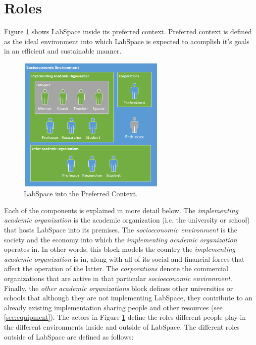 \documentclass[a4paper, 11pt]{article}
\begin{document}
\section{Roles}
Figure \ref{fig:ls_env} shows LabSpace inside its preferred context. Preferred context is defined as the ideal environment into which LabSpace is expected to acomplish it's goals in an efficient and sustainable manner.

\begin{figure}[h!]
  \begin{center}
    \includegraphics[width=270px,height=\textheight,keepaspectratio]{imagery/ls_context.png}
    \caption{LabSpace into the Preferred Context.}
    \label{fig:ls_env}
  \end{center}
\end{figure}

Each of the components is explained in more detail below. The \textit{implementing academic organization} is the academic organization (i.e. the university or school) that hosts LabSpace into its premises. The \textit{socioeconomic environment} is the society and the economy into which the \textit{implementing academic organization} operates in. In other words, this block models the country the \textit{implementing academic organization} is in, along with all of its social and financial forces that affect the operation of the latter. The \textit{corporations} denote the commercial organizations that are active in that particular \textit{socioeconomic environment}. Finally, the \textit{other academic organizations} block defines other universities or schools that although they are not implementing LabSpace, they contribute to an already existing implementation sharing people and other resources (see \ref{sec:equipment}). The actors in Figure \ref{fig:ls_env} define the roles different people play in the different environments inside and outside of LabSpace. 
The different roles outside of LabSpace are defined as follows:
\end{document}
